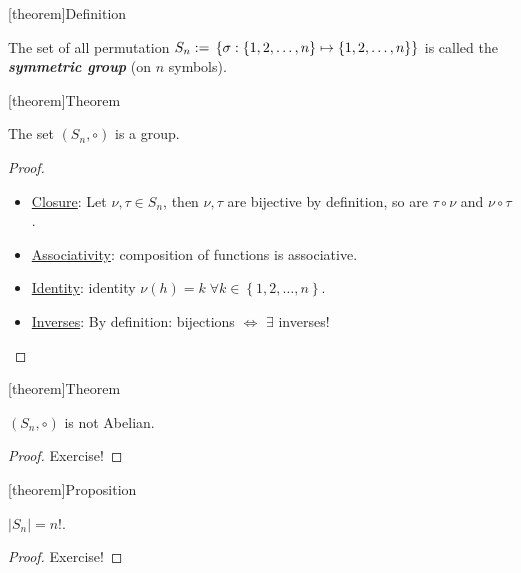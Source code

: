 \documentclass[12pt]{report}
\theoremstyle{definition}
\begin{document}
[theorem]{Definition}
\begin{symmetric group}
    The set of all permutation $S_n := \\\left\{ \sigma : 
    \left\{1, 2, \ldots, n\right\}  \mapsto \left\{1, 2, \ldots, n\right\} \right\} $
    is called the \textbf{\emph{symmetric group}} (on $n$ symbols).
\end{symmetric group}

[theorem]{Theorem}
\begin{permutation is a group}
    The set $(S_n, \circ)$ is a group.
\end{permutation is a group}

\begin{proof}
    \,

    \begin{itemize}
            \item \underline{Closure}: Let $\nu, \tau \in S_n$, 
                then $\nu, \tau$ are bijective by definition,
                so are $\tau \circ \nu$ and $\nu \circ \tau$.
            \item \underline{Associativity}: composition of functions is associative.
            \item \underline{Identity}: identity $\nu (h) = k \;\forall k \in \left\{1, 2, \ldots, n\right\} $.
            \item \underline{Inverses}: By definition: bijections $\iff$ $\exists$ inverses!
    \end{itemize}
\end{proof}

[theorem]{Theorem}
\begin{permutation is not Abelian}
    $(S_n, \circ)$ is not Abelian.
\end{permutation is not Abelian}

\begin{proof}
    Exercise!
\end{proof}

[theorem]{Proposition}
\begin{order of Sn is n!}
    $|S_n| = {n!}$.
\end{order of Sn is n!}

\begin{proof}
    Exercise!
\end{proof}
\end{document}
